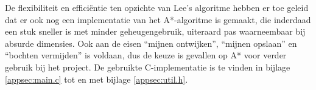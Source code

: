 \documentclass{report}
\begin{document}
De flexibiliteit en efficiëntie ten opzichte van Lee's algoritme hebben er toe geleid dat er ook nog een implementatie van het A*-algoritme is gemaakt, die inderdaad een stuk sneller is met minder geheugengebruik, uiteraard pas waarneembaar bij absurde dimensies.
Ook aan de eisen ``mijnen ontwijken'', ``mijnen opslaan'' en ``bochten vermijden'' is voldaan, dus de keuze is gevallen op A* voor verder gebruik bij het project.
De gebruikte C-implementatie is te vinden in bijlage \ref{appsec:main.c} tot en met bijlage \ref{appsec:util.h}.
\end{document}
